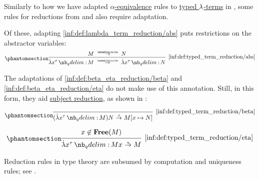 \begin{definition}\label{def:typed_term_reduction}
  Similarly to how we have adapted \hyperref[def:lambda_term_alpha_equivalence]{\( \alpha \)-equivalence} rules to \hyperref[def:typed_lambda_term]{typed \( {\mathrm \lambda} \)-terms} in , some rules for reductions from  and  also require adaptation.

  Of these, adapting \ref{inf:def:lambda_term_reduction/abs} puts restrictions on the abstractor variables:
  \begin{equation*}\taglabel[\ensuremath{ \logic{Abs}_{\Anon}^{\logic{tt}} }]{inf:def:typed_term_reduction/abs}
    \begin{prooftree}
      \hypo{ M \pred N }
      \infer1[\ref{inf:def:typed_term_reduction/abs}]{ \qabs {x^\tau} M \pred \qabs {x^\tau} N }.
    \end{prooftree}
  \end{equation*}

  The adaptations of \ref{inf:def:beta_eta_reduction/beta} and \ref{inf:def:beta_eta_reduction/eta} do not make use of this annotation. Still, in this form, they aid \hyperref[con:subject_reduction]{subject reduction}, as shown in :
  \begin{paracol}{2}
    \begin{leftcolumn}
      \ParacolAlignmentHack
      \begin{equation*}\taglabel[\ensuremath{ \logic{Red}_\beta^{\logic{tt}} }]{inf:def:typed_term_reduction/beta}
        \begin{prooftree}
          \infer0[\ref{inf:def:typed_term_reduction/beta}]{ (\qabs {x^\tau} M) N \bred M[x \mapsto N] }.
        \end{prooftree}
      \end{equation*}
    \end{leftcolumn}

    \begin{rightcolumn}
      \ParacolAlignmentHack
      \begin{equation*}\taglabel[\ensuremath{ \logic{Red}_\eta^{\logic{tt}} }]{inf:def:typed_term_reduction/eta}
        \begin{prooftree}
          \hypo{ x \not\in \op*{Free}(M) }
          \infer1[\ref{inf:def:typed_term_reduction/eta}]{ \qabs {x^\tau} M x \ered M }.
        \end{prooftree}
      \end{equation*}
    \end{rightcolumn}
  \end{paracol}
\end{definition}
\begin{comments}
  \item Reduction rules in type theory are subsumed by computation and uniqueness rules; see .
\end{comments}

